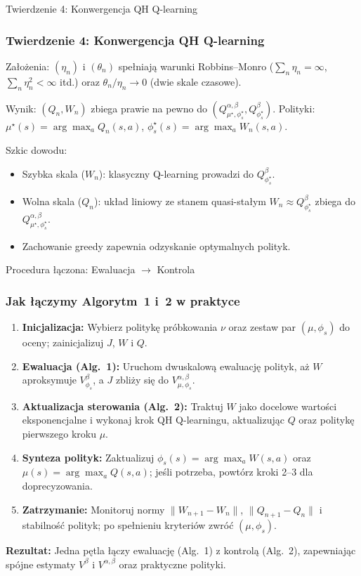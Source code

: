 \begin{frame}{Twierdzenie 4: Konwergencja QH Q-learning}
\frametitle{Twierdzenie 4: Konwergencja QH Q-learning}
Założenia: $(\eta_n)$ i $(\theta_n)$ spełniają warunki Robbins--Monro ($\sum_n \eta_n = \infty$, $\sum_n \eta_n^2 < \infty$ itd.) oraz $\theta_n / \eta_n \to 0$ (dwie skale czasowe).

Wynik: $(Q_n, W_n)$ zbiega prawie na pewno do $(Q^{\alpha, \beta}_{\mu^\star, \phi_s^\star}, Q^{\beta}_{\phi_s^\star})$. Polityki: $\mu^\star(s) = \arg\max_a Q_n(s,a)$, $\phi_s^\star(s) = \arg\max_a W_n(s,a)$.

Szkic dowodu:
\begin{itemize}
\item Szybka skala ($W_n$): klasyczny Q-learning prowadzi do $Q^{\beta}_{\phi_s^\star}$.
\item Wolna skala ($Q_n$): układ liniowy ze stanem quasi-stałym $W_n \approx Q^{\beta}_{\phi_s^\star}$ zbiega do $Q^{\alpha, \beta}_{\mu^\star, \phi_s^\star}$.
\item Zachowanie greedy zapewnia odzyskanie optymalnych polityk.
\end{itemize}
\end{frame}

\begin{frame}{Procedura łączona: Ewaluacja $\to$ Kontrola}
\frametitle{Jak łączymy Algorytm~1 i~2 w praktyce}
\begin{enumerate}
	\item \textbf{Inicjalizacja:} Wybierz politykę próbkowania $\nu$ oraz zestaw par $(\mu, \phi_s)$ do oceny; zainicjalizuj $J$, $W$ i $Q$.
	\item \textbf{Ewaluacja (Alg.~1):} Uruchom dwuskalową ewaluację polityk, aż $W$ aproksymuje $V^{\beta}_{\phi_s}$, a $J$ zbliży się do $V^{\alpha,\beta}_{\mu,\phi_s}$.
	\item \textbf{Aktualizacja sterowania (Alg.~2):} Traktuj $W$ jako docelowe wartości eksponencjalne i wykonaj krok QH Q-learningu, aktualizując $Q$ oraz politykę pierwszego kroku $\mu$.
	\item \textbf{Synteza polityk:} Zaktualizuj $\phi_s(s) = \arg\max_a W(s,a)$ oraz $\mu(s) = \arg\max_a Q(s,a)$; jeśli potrzeba, powtórz kroki 2--3 dla doprecyzowania.
	\item \textbf{Zatrzymanie:} Monitoruj normy $\|W_{n+1}-W_n\|$, $\|Q_{n+1}-Q_n\|$ i stabilność polityk; po spełnieniu kryteriów zwróć $(\mu, \phi_s)$.
\end{enumerate}
\vspace{0.6em}
	\textbf{Rezultat:} Jedna pętla łączy ewaluację (Alg.~1) z kontrolą (Alg.~2), zapewniając spójne estymaty $V^{\beta}$ i $V^{\alpha,\beta}$ oraz praktyczne polityki.
\end{frame}
